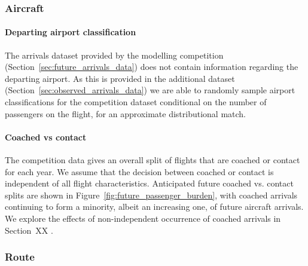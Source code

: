 \documentclass[10pt]{article}
\begin{document}
\subsubsection{Aircraft}

\paragraph{Departing airport classification}
The arrivals dataset provided by the modelling competition (Section~\ref{sec:future_arrivals_data}) does not contain information regarding the departing airport. As this is provided in the additional dataset (Section~\ref{sec:observed_arrivals_data}) we are able to randomly sample airport classifications for the competition dataset conditional on the number of passengers on the flight, for an approximate distributional match. 




\paragraph{Coached vs contact}
The competition data gives an overall split of flights that are coached or contact for each year. We assume that the decision between coached or contact is independent of all flight characteristics. Anticipated future coached vs. contact splits are shown in Figure~\ref{fig:future_passenger_burden}, with coached arrivals continuing to form a minority, albeit an increasing one, of future aircraft arrivals. We explore the effects of non-independent occurrence of coached arrivals in Section~XX .


\subsubsection{Route}
\end{document}
